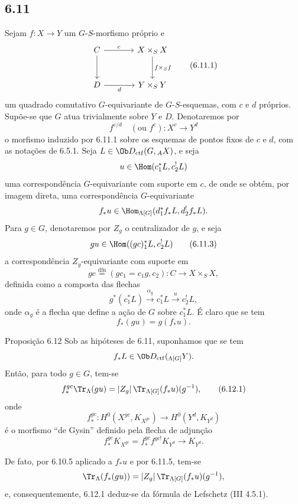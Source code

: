 \subsection*{6.11}
Sejam $f:X\to Y$ um $G$-$S$-morfismo próprio e
\begin{equation}
\begin{tikzcd}[column sep=large,row sep=large]
C \arrow[r,"c"] \arrow[d] & X\times_SX \arrow[d,"f\times_Sf"]\\
D \arrow[r,"d"'] & Y\times_SY
\end{tikzcd}
\tag{6.11.1}
\end{equation}
um quadrado comutativo $G$-equivariante de $G$-$S$-esquemas, com $c$ e $d$ próprios. Supõe-se que $G$ atua trivialmente sobre $Y$ e $D$. Denotaremos por
\begin{equation}
f^{c/d}\quad(\text{ou } f^c):X^c\longrightarrow Y^d
\tag{6.11.2}
\end{equation}
o morfismo induzido por 6.11.1 sobre os esquemas de pontos fixos de $c$ e $d$, com as notações de 6.5.1. Seja $L\in\Ob D_{\mathrm{ctf}}(G,{}_AX)$, e seja
\[
u\in\Hom(c_1^*L,c_2^!L)
\]
uma correspondência $G$-equivariante com suporte em $c$, de onde se obtém, por imagem direta, uma correspondência $G$-equivariante
\[
f_*u\in\Hom_{\Lambda[G]}(d_1^*f_*L,d_2^!f_*L).
\]
Para $g\in G$, denotaremos por $Z_g$ o centralizador de $g$, e seja
\begin{equation}
gu\in\Hom((gc)_1^*L,c_2^!L)
\tag{6.11.3}
\end{equation}
a correspondência $Z_g$-equivariante com suporte em
\begin{equation}
gc\stackrel{\mathrm{dfn}}{=}(gc_1=c_1g,c_2):C\to X\times_SX,
\tag{6.11.4}
\end{equation}
definida como a composta das flechas
\[
g^*(c_1^*L)\xrightarrow{\alpha_g}c_1^*L\xrightarrow{u}c_2^!L,
\]
onde $\alpha_g$ é a flecha que define a ação de $G$ sobre $c_1^*L$. É claro que se tem
\begin{equation}
f_*(gu)=g(f_*u).
\tag{6.11.5}
\end{equation}

\begin{statement}{Proposição 6.12}
Sob as hipóteses de 6.11, suponhamos que se tem
\[
f_*L\in\Ob D_{\mathrm{ctf}}({}_{\Lambda[G]}Y).
\]
Então, para todo $g\in G$, tem-se
\begin{equation}
f_*^{gc}\Tr_{\Lambda}(gu)
=
|Z_g|\,\Tr_{\Lambda[G]}(f_*u)(g^{-1}),
\tag{6.12.1}
\end{equation}
onde
\[
f_*^{gc}:H^0(X^{gc},K_{X^{gc}})\longrightarrow H^0(Y^d,K_{Y^d})
\]
é o morfismo ``de Gysin'' definido pela flecha de adjunção
\[
f_*^{gc}K_{X^{gc}}=f_*^{gc}f^{gc!}K_{Y^d}\longrightarrow K_{Y^d}.
\]
\end{statement}

De fato, por 6.10.5 aplicado a $f_*u$ e por 6.11.5, tem-se
\[
\Tr_{\Lambda}(f_*(gu))=|Z_g|\,\Tr_{\Lambda[G]}(f_*u)(g^{-1}),
\]
e, consequentemente, 6.12.1 deduz-se da fórmula de Lefschetz (III 4.5.1).
